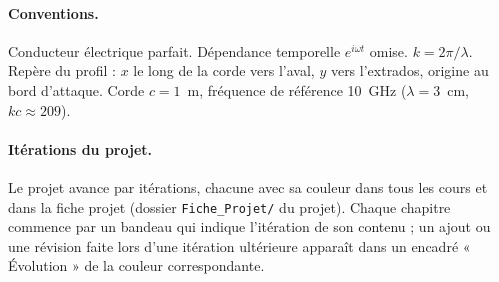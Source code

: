 \documentclass[11pt,a4paper]{report}
\begin{document}
\paragraph{Conventions.} Conducteur électrique parfait. Dépendance temporelle $e^{i\omega t}$ omise. $k=2\pi/\lambda$. Repère du profil : $x$ le long de la corde vers l'aval, $y$ vers l'extrados, origine au bord d'attaque. Corde $c=1$~m, fréquence de référence 10~GHz ($\lambda=3$~cm, $kc\approx209$).

\paragraph{Itérations du projet.} Le projet avance par itérations, chacune avec sa couleur dans tous les cours et dans la fiche projet (dossier \texttt{Fiche\_Projet/} du projet). Chaque chapitre commence par un bandeau qui indique l'itération de son contenu ; un ajout ou une révision faite lors d'une itération ultérieure apparaît dans un encadré « Évolution » de la couleur correspondante.
\legendeiterations

\tableofcontents
\cleardoublepage
{}











\appendix

\end{document}
